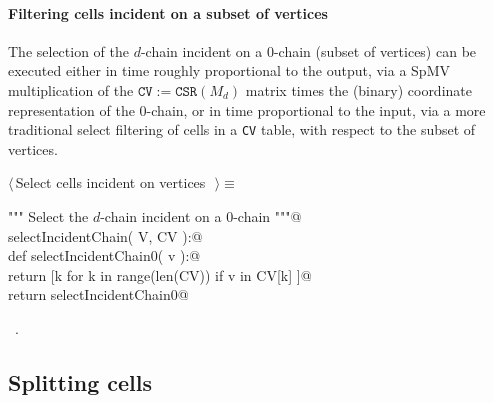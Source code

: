 \documentclass[11pt,oneside]{article}	%
\begin{document}
\paragraph{Filtering cells incident on a subset of vertices}

The selection of the $d$-chain incident on a $0$-chain (subset of vertices) can be executed either in time roughly proportional to the output, via a SpMV multiplication of the $\texttt{CV} := \texttt{CSR}(M_d)$ matrix times the (binary) coordinate representation of the $0$-chain, or in time proportional to the input, via a more traditional select filtering of cells in a \texttt{CV} table, with respect to the subset of vertices.


\begin{flushleft} \small \label{scrap21}
$\langle\,$Select cells incident on vertices\nobreak\ {\footnotesize {}}$\,\rangle\equiv$
\vspace{-1ex}
\begin{list}{}{} \item
\mbox{}\verb@""" Select the $d$-chain incident on a $0$-chain """@\\
\mbox{}\verb@def selectIncidentChain( V, CV ):@\\
\mbox{}\verb@   def selectIncidentChain0( v ):@\\
\mbox{}\verb@      return [k for k in range(len(CV)) if v in CV[k] ]@\\
\mbox{}\verb@   return selectIncidentChain0@\\
\mbox{}\verb@@{\NWsep}
\end{list}
\vspace{-1ex}
\footnotesize\addtolength{\baselineskip}{-1ex}
\begin{list}{}{\setlength{\itemsep}{-\parsep}\setlength{\itemindent}{-\leftmargin}}
\item \NWtxtMacroRefIn\ .
\end{list}
\end{flushleft}


\subsection{Splitting cells}
\end{document}
